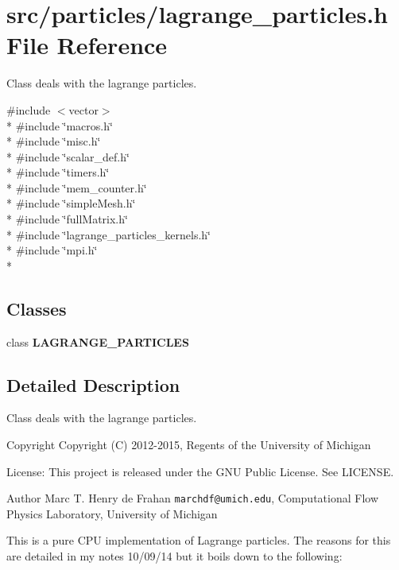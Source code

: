 \section{src/particles/lagrange\-\_\-particles.h File Reference}
\label{lagrange__particles_8h}


Class deals with the lagrange particles.  


{\ttfamily \#include $<$vector$>$}\\*
{\ttfamily \#include \char`\"{}macros.\-h\char`\"{}}\\*
{\ttfamily \#include \char`\"{}misc.\-h\char`\"{}}\\*
{\ttfamily \#include \char`\"{}scalar\-\_\-def.\-h\char`\"{}}\\*
{\ttfamily \#include \char`\"{}timers.\-h\char`\"{}}\\*
{\ttfamily \#include \char`\"{}mem\-\_\-counter.\-h\char`\"{}}\\*
{\ttfamily \#include \char`\"{}simple\-Mesh.\-h\char`\"{}}\\*
{\ttfamily \#include \char`\"{}full\-Matrix.\-h\char`\"{}}\\*
{\ttfamily \#include \char`\"{}lagrange\-\_\-particles\-\_\-kernels.\-h\char`\"{}}\\*
{\ttfamily \#include \char`\"{}mpi.\-h\char`\"{}}\\*
\subsection*{Classes}
\begin{DoxyCompactItemize}
\item 
class {\bf L\-A\-G\-R\-A\-N\-G\-E\-\_\-\-P\-A\-R\-T\-I\-C\-L\-E\-S}
\end{DoxyCompactItemize}


\subsection{Detailed Description}
Class deals with the lagrange particles. \begin{DoxyCopyright}{Copyright}
Copyright (C) 2012-\/2015, Regents of the University of Michigan 
\end{DoxyCopyright}
\begin{DoxyParagraph}{License\-:}
This project is released under the G\-N\-U Public License. See L\-I\-C\-E\-N\-S\-E. 
\end{DoxyParagraph}
\begin{DoxyAuthor}{Author}
Marc T. Henry de Frahan {\tt marchdf@umich.\-edu}, Computational Flow Physics Laboratory, University of Michigan
\end{DoxyAuthor}
This is a pure C\-P\-U implementation of Lagrange particles. The reasons for this are detailed in my notes 10/09/14 but it boils down to the following\-:


